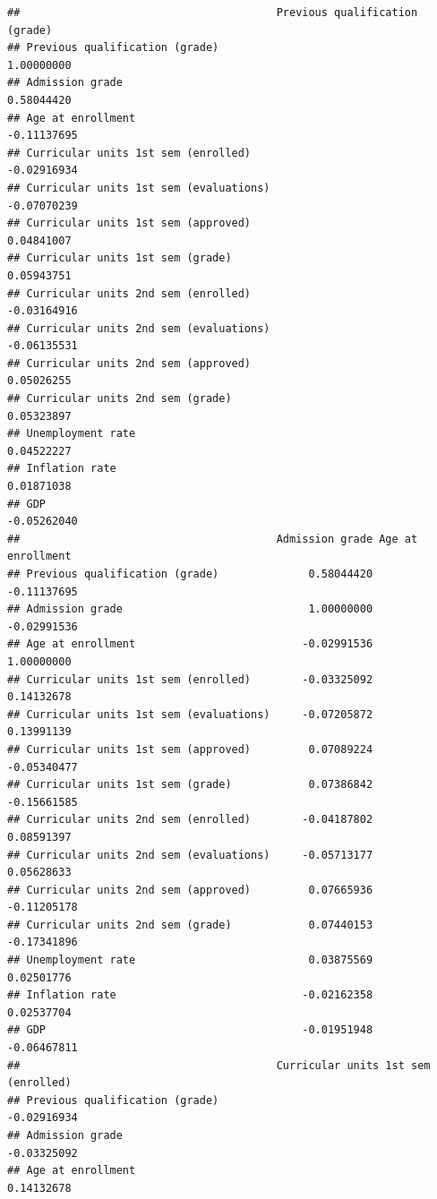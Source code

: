 \documentclass[
]{article}
\begin{document}
\begin{verbatim}
##                                        Previous qualification (grade)
## Previous qualification (grade)                             1.00000000
## Admission grade                                            0.58044420
## Age at enrollment                                         -0.11137695
## Curricular units 1st sem (enrolled)                       -0.02916934
## Curricular units 1st sem (evaluations)                    -0.07070239
## Curricular units 1st sem (approved)                        0.04841007
## Curricular units 1st sem (grade)                           0.05943751
## Curricular units 2nd sem (enrolled)                       -0.03164916
## Curricular units 2nd sem (evaluations)                    -0.06135531
## Curricular units 2nd sem (approved)                        0.05026255
## Curricular units 2nd sem (grade)                           0.05323897
## Unemployment rate                                          0.04522227
## Inflation rate                                             0.01871038
## GDP                                                       -0.05262040
##                                        Admission grade Age at enrollment
## Previous qualification (grade)              0.58044420       -0.11137695
## Admission grade                             1.00000000       -0.02991536
## Age at enrollment                          -0.02991536        1.00000000
## Curricular units 1st sem (enrolled)        -0.03325092        0.14132678
## Curricular units 1st sem (evaluations)     -0.07205872        0.13991139
## Curricular units 1st sem (approved)         0.07089224       -0.05340477
## Curricular units 1st sem (grade)            0.07386842       -0.15661585
## Curricular units 2nd sem (enrolled)        -0.04187802        0.08591397
## Curricular units 2nd sem (evaluations)     -0.05713177        0.05628633
## Curricular units 2nd sem (approved)         0.07665936       -0.11205178
## Curricular units 2nd sem (grade)            0.07440153       -0.17341896
## Unemployment rate                           0.03875569        0.02501776
## Inflation rate                             -0.02162358        0.02537704
## GDP                                        -0.01951948       -0.06467811
##                                        Curricular units 1st sem (enrolled)
## Previous qualification (grade)                                 -0.02916934
## Admission grade                                                -0.03325092
## Age at enrollment                                               0.14132678

\end{verbatim}
\end{document}
